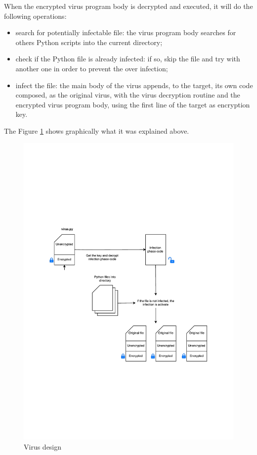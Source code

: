 \documentclass[a4paper,11pt]{article}
\begin{document}
When the encrypted virus program body is decrypted and executed, it will do the following operations:
\begin{itemize}
\item search for potentially infectable file: the virus program body searches for others Python scripts into the current directory;
\item check if the Python file is already infected: if so, skip the file and try with another one in order to prevent the over infection;
\item infect the file: the main body of the virus appends, to the target,  its own code composed, as the original virus, with the virus decryption routine and the encrypted virus program body, using the first line of the target as encryption key.
\end{itemize}

The Figure \ref{fig:mission} shows graphically what it was explained above.

\begin{figure}
\centering
\includegraphics[scale=0.8]{img/virus-design}
\caption{Virus design\label{fig:mission}}
\end{figure}
\end{document}
